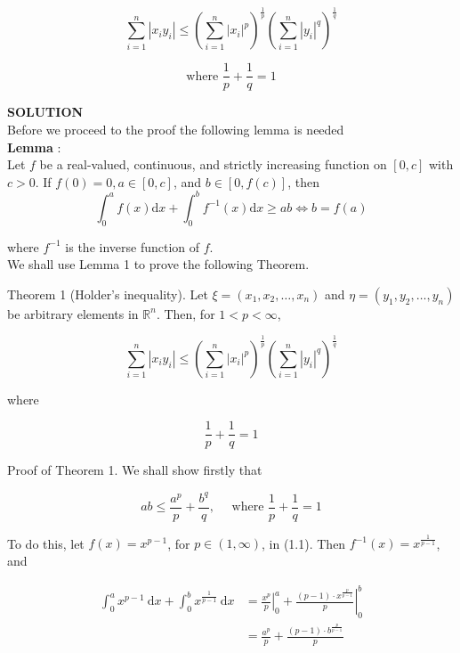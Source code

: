 \documentclass{article}
\begin{document}
$$
\sum_{i=1}^{n}\left|x_{i} y_{i}\right| \leq\left(\sum_{i=1}^{n}\left|x_{i}\right|^{p}\right)^{\frac{1}{p}}\left(\sum_{i=1}^{n}\left|y_{i}\right|^{q}\right)^{\frac{1}{q}}
$$

$$\text{where } \frac{1}{p}+\frac{1}{q}=1$$

\textbf{SOLUTION}\\

\large
Before we proceed to the proof the following lemma is needed\\

\textbf{Lemma }:\\
Let $f$ be a real-valued, continuous, and strictly increasing function on $[0, c]$ with $c>0$. If $f(0)=0, a \in[0, c]$, and $b \in[0, f(c)]$, then
\begin{equation}\tag{1.1}
\int_{0}^{a} f(x) \mathrm{d} x+\int_{0}^{b} f^{-1}(x) \mathrm{d} x \geq a b \iff b=f(a)
\end{equation}

where $f^{-1}$ is the inverse function of $f$.\\

We shall use Lemma 1 to prove the following Theorem.

Theorem 1 (Holder's inequality). Let $\xi=\left(x_{1}, x_{2}, \ldots, x_{n}\right)$ and $\eta=\left(y_{1}, y_{2}, \ldots, y_{n}\right)$ be arbitrary elements in $\mathbb{R}^{n}$. Then, for $1<p<\infty$,

\begin{equation}\tag{1.2}
\sum_{i=1}^{n}\left|x_{i} y_{i}\right| \leq\left(\sum_{i=1}^{n}\left|x_{i}\right|^{p}\right)^{\frac{1}{p}}\left(\sum_{i=1}^{n}\left|y_{i}\right|^{q}\right)^{\frac{1}{q}}
\end{equation}

where

$$
\frac{1}{p}+\frac{1}{q}=1
$$

Proof of Theorem 1. We shall show firstly that

\begin{equation}\tag{1.3}
a b \leq \frac{a^{p}}{p}+\frac{b^{q}}{q}, \quad \text { where } \frac{1}{p}+\frac{1}{q}=1
\end{equation}

To do this, let $f(x)=x^{p-1}$, for $p \in(1, \infty)$, in (1.1). Then $f^{-1}(x)=x^{\frac{1}{p-1}}$, and

$$
\begin{aligned}
\int_{0}^{a} x^{p-1} \mathrm{~d} x+\int_{0}^{b} x^{\frac{1}{p-1}} \mathrm{~d} x & =\left.\frac{x^{p}}{p}\right|_{0} ^{a}+\left.\frac{(p-1) \cdot x^{\frac{p}{p-1}}}{p}\right|_{0} ^{b} \\
& =\frac{a^{p}}{p}+\frac{(p-1) \cdot b^{\frac{p}{p-1}}}{p}
\end{aligned}
$$
\end{document}
